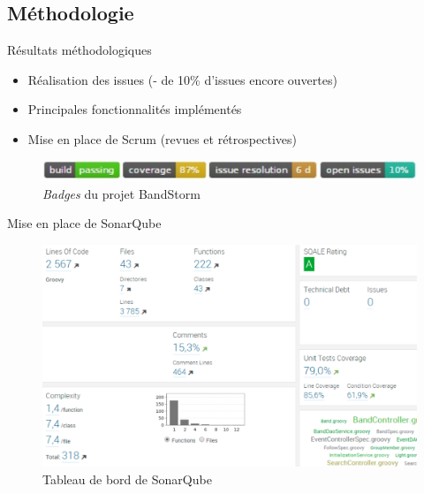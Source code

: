 
\subsection{Méthodologie}
\DylanSpeak
\begin{frame}{Résultats méthodologiques}
	\begin{itemize}
	\item Réalisation des issues \scriptsize{(- de 10\% d’issues encore ouvertes)}
	\normalsize
	\item Principales fonctionnalités implémentés
	\item Mise en place de Scrum \scriptsize{(revues et rétrospectives)}
	\end{itemize}
	\begin{figure}[H]
		\centering
		\includegraphics[width=0.8\linewidth]{"images/Results/methodo/badges"}
		\caption{\textit{Badges} du projet BandStorm}
		\label{fig:badges}
	\end{figure}\end{frame}
\SteveSpeak
\begin{frame}{Mise en place de SonarQube}
\begin{figure}
	\centering
	\includegraphics[width=0.95\linewidth]{"images/Results/methodo/sonar"}
	\caption{Tableau de bord de SonarQube}
	\label{fig:sonar}
\end{figure}
	
\end{frame}

